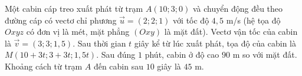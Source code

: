 \begin{ex}
Một cabin cáp treo xuất phát từ trạm $A(10;3;0)$ và chuyển động đều theo đường cáp có vectơ chỉ phương $\vec{u}=(2;2;1)$ với tốc độ $4{,}5$ m/s (hệ tọa độ $Oxyz$ có đơn vị là mét, mặt phẳng $(Oxy)$ là mặt đất).
\choiceTF
{\True Vectơ vận tốc của cabin là $\vec{v}=(3;3;1{,}5)$.}
{\True Sau thời gian $t$ giây kể từ lúc xuất phát, tọa độ của cabin là $M(10+3t;3+3t;1{,}5t)$.}
{\True Sau đúng $1$ phút, cabin ở độ cao $90$ m so với mặt đất.}
{\True Khoảng cách từ trạm $A$ đến cabin sau $10$ giây là $45$ m.}
\end{ex}
